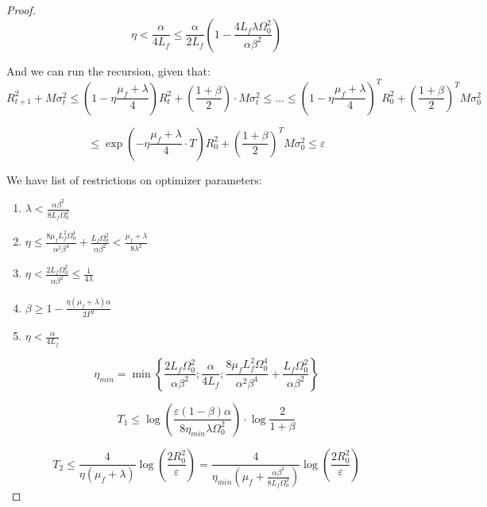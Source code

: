 \begin{proof}
\begin{equation*}
    \eta < \frac{\alpha}{4 L_f} \leq \frac{\alpha}{2L_f} \left(1 - \frac{4L_f\lambda\Omega_0^2}{\alpha\beta^2} \right)
\end{equation*}

\newpage
And we can run the recursion, given that:
\begin{equation*}
    R_{t+1}^2 + M \sigma_t^2 \leq \left(1-\eta\frac{\mu_f+\lambda}{4} \right) R_t^2 + \left(\frac{1+\beta}{2}\right) \cdot M \sigma_t^2 \leq ... \leq \left(1-\eta\frac{\mu_f+\lambda}{4} \right)^T R_0^2 + \left(\frac{1+\beta}{2}\right)^T M \sigma_0^2
\end{equation*}

\begin{equation*}
    \leq \exp{\left(-\eta\frac{\mu_f + \lambda}{4} \cdot T\right)} R_0^2 + \left(\frac{1+\beta}{2} \right)^T M \sigma_0^2 \leq \varepsilon
\end{equation*}

We have list of restrictions on optimizer parameters:
\begin{enumerate}
    \item $\lambda < \frac{\alpha \beta^2}{8L_f \Omega_0^2}$
    \item $\eta \leq \frac{8\mu_f L_f^2 \Omega_0^4}{\alpha^2 \beta^4} + \frac{L_f \Omega_0^2}{\alpha \beta^2} < \frac{\mu_f + \lambda}{8\lambda^2}$
    \item $\eta < \frac{2L_f \Omega_0^2}{\alpha \beta^2} \leq \frac{1}{4\lambda}$
    \item $\beta \geq 1 - \frac{\eta(\mu_f + \lambda)\alpha}{2 \Gamma^2}$
    \item $\eta < \frac{\alpha}{4L_f}$
    
\end{enumerate}

\begin{equation*}
    \eta_{min} = \min \left\{ \frac{2L_f \Omega_0^2}{\alpha \beta^2}; \frac{\alpha}{4L_f}; \frac{8\mu_f L_f^2 \Omega_0^4}{\alpha^2 \beta^4} + \frac{L_f \Omega_0^2}{\alpha \beta^2} \right\}
\end{equation*}


$$
T_1 \leq \log{\left( \frac{\varepsilon (1-\beta) \alpha }{8 \eta_{min} \lambda \Omega_0^2} \right)} \cdot \log{\frac{2}{1+\beta}}
$$

$$
T_2 \leq \frac{4}{\eta(\mu_f + \lambda)} \log{\left(\frac{2 R_0^2}{\varepsilon} \right)} = \frac{4}{\eta_{min} \left(\mu_f + \frac{\alpha \beta^2}{8L_f \Omega_0^2} \right)}\log{\left(\frac{2 R_0^2}{\varepsilon} \right)}
$$


\end{proof}
